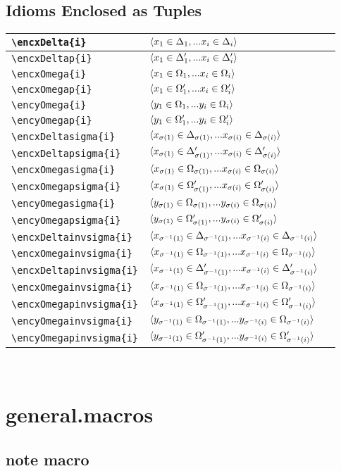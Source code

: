 \documentclass[10pt,a4paper]{article}
\begin{document}
\subsection{Idioms Enclosed as Tuples}
\begin{tabular}{| l | l |p{3cm}|}
\hline
\verb!\encxDelta{i}! & $\encxDelta{i}$&\\
 \hline
\verb!\encxDeltap{i}! & $\encxDeltap{i}$&\\
 \hline
\verb!\encxOmega{i}! & $\encxOmega{i}$&\\
 \hline
\verb!\encxOmegap{i}! & $\encxOmegap{i}$&\\
 \hline
\verb!\encyOmega{i}! & $\encyOmega{i}$&\\
 \hline
\verb!\encyOmegap{i}! & $\encyOmegap{i}$&\\
 \hline
\hline
\verb!\encxDeltasigma{i}! & $\encxDeltasigma{i}$&\\
\hline
\verb!\encxDeltapsigma{i}! & $\encxDeltapsigma{i}$&\\
 \hline
\verb!\encxOmegasigma{i}! & $\encxOmegasigma{i}$&\\
 \hline
\verb!\encxOmegapsigma{i}! & $\encxOmegapsigma{i}$&\\
 \hline
\verb!\encyOmegasigma{i}! & $\encyOmegasigma{i}$&\\
 \hline
\verb!\encyOmegapsigma{i}! & $\encyOmegapsigma{i}$&\\
 \hline
\hline
\verb!\encxDeltainvsigma{i}! & $\encxDeltainvsigma{i}$&\\
 \hline
\verb!\encxOmegainvsigma{i}! & $\encxOmegainvsigma{i}$&\\
\hline
\verb!\encxDeltapinvsigma{i}! & $\encxDeltapinvsigma{i}$&\\
 \hline
\verb!\encxOmegainvsigma{i}! & $\encxOmegainvsigma{i}$&\\
 \hline
\verb!\encxOmegapinvsigma{i}! & $\encxOmegapinvsigma{i}$&\\
 \hline
\verb!\encyOmegainvsigma{i}! & $\encyOmegainvsigma{i}$&\\
 \hline
\verb!\encyOmegapinvsigma{i}! & $\encyOmegapinvsigma{i}$&\\
 \hline
\end{tabular} \\

\section {general.macros}

\subsection{ note macro}
\end{document}
